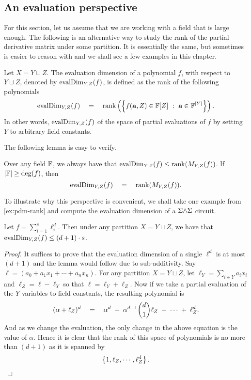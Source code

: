 \subsection{An evaluation perspective}

For this section, let us assume that we are working with a field that is large enough. The following is an alternative way to study the rank of the partial derivative matrix under some partition. It is essentially the same, but sometimes is easier to reason with and we shall see a few examples in this chapter. 

\begin{definition}
Let $X = Y \sqcup Z$. The evaluation dimension of a polynomial $f$, with respect to $Y \sqcup Z$, denoted by $\operatorname{evalDim}_{Y,Z}(f)$,  is defined as the rank of the following polynomials
\[
\operatorname{evalDim}_{Y,Z}(f) \quad = \quad \operatorname{rank}\left(\left\{{f(\mathbf{a}, Z) \in \mathbb{F}[Z]}\ : \ {\mathbf{a} \in \mathbb{F}^{|Y|}}\right\}\right). 
\]
In other words, $\operatorname{evalDim}_{Y,Z}(f)$ of the space of partial evaluations of $f$ by setting $Y$ to arbitrary field constants. 
\end{definition}

\noindent 
The following lemma is easy to verify.

\begin{lemma}
Over any field $\mathbb{F}$, we always have that $\operatorname{evalDim}_{Y,Z}(f) \leq \operatorname{rank}(M_{Y,Z}(f))$. If $|\mathbb{F}| \geq \deg(f)$, then
\[
\operatorname{evalDim}_{Y,Z}(f) \quad = \quad \operatorname{rank}(M_{Y,Z}(f)).
\]
\end{lemma}

To illustrate why this perspective is convenient, we shall take one example from \autoref{ex:pdm-rank} and compute the evaluation dimension of a $\Sigma\mathord{\wedge}\Sigma$ circuit. 

\begin{claim}
Let $f = \sum_{i=1}^s \ell_i^d$. Then under any partition $X = Y \sqcup Z$, we have that $\operatorname{evalDim}_{Y,Z}(f) \leq (d+1) \cdot s$. 
\end{claim}
\begin{proof}
  It suffices to prove that the evaluation dimension of a single $\ell^d$ is at most $(d+1)$ and the lemma would follow due to sub-additivity.
Say $\ell = (a_0 + a_1 x_1 + \cdots + a_nx_n)$.
For any partition $X = Y \sqcup Z$, let $\ell_Y = \sum_{i\in Y} a_i x_i$ and $\ell_Z = \ell - \ell_Y$ so that $\ell = \ell_Y + \ell_Z$. Now if we take a partial evaluation of the $Y$ variables to field constants, the resulting polynomial is 
\[
(\alpha + \ell_Z)^d \quad = \quad \alpha^d \;+\; \alpha^{d-1} \binom{d}{1} \ell_Z \;+\; \cdots \;+\; \ell_Z^d. 
\]
And as we change the evaluation, the only change in the above equation is the value of $\alpha$. Hence it is clear that the rank of this space of polynomials is no more than $(d+1)$ as it is spanned by 
\[
\left\{1, \ell_Z, \cdots, \ell_Z^d\right\}.\qedhere
\]
\end{proof}

